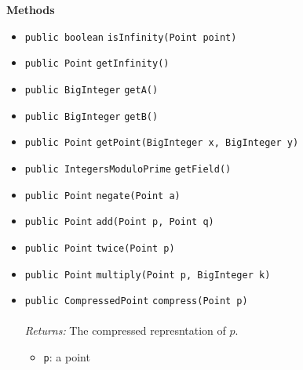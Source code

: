 \textbf{\sffamily Methods}
\begin{itemize}
\item \lstinline|public boolean| \lstinline|isInfinity|\lstinline|(Point point)| \\[-0.6em]




\item \lstinline|public Point| \lstinline|getInfinity|\lstinline|()| \\[-0.6em]




\item \lstinline|public BigInteger| \lstinline|getA|\lstinline|()| \\[-0.6em]




\item \lstinline|public BigInteger| \lstinline|getB|\lstinline|()| \\[-0.6em]




\item \lstinline|public Point| \lstinline|getPoint|\lstinline|(BigInteger x, BigInteger y)| \\[-0.6em]




\item \lstinline|public IntegersModuloPrime| \lstinline|getField|\lstinline|()| \\[-0.6em]




\item \lstinline|public Point| \lstinline|negate|\lstinline|(Point a)| \\[-0.6em]




\item \lstinline|public Point| \lstinline|add|\lstinline|(Point p, Point q)| \\[-0.6em]




\item \lstinline|public Point| \lstinline|twice|\lstinline|(Point p)| \\[-0.6em]




\item \lstinline|public Point| \lstinline|multiply|\lstinline|(Point p, BigInteger k)| \\[-0.6em]




\item \lstinline|public CompressedPoint| \lstinline|compress|\lstinline|(Point p)|\\ \\[-0.6em]
\emph{Returns:} The compressed represntation of $p$.
\begin{itemize}
\item \lstinline|p|: a point
\end{itemize}




\end{itemize}
